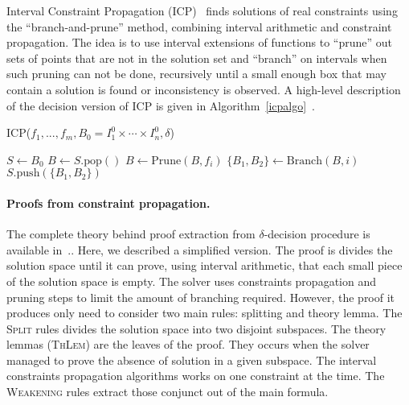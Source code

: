 Interval Constraint Propagation (ICP)~\cite{handbookICP} finds
solutions of real constraints using the ``branch-and-prune'' method, combining
interval arithmetic and constraint propagation. The idea is to use interval
extensions of functions to ``prune'' out sets of points that are not in the
solution set and ``branch'' on intervals when
such pruning can not be done, recursively until a small enough box
that may contain a solution is found or inconsistency is observed. A high-level description of the decision version of ICP is given in Algorithm~\ref{icpalgo}~\cite{handbookICP,DBLP:conf/cade/GaoAC12}.
\begin{algorithm}\label{algo1}
\caption{ICP($f_1,...,f_m, B_0 = I_1^0\times\cdots\times I_n^0, \delta$)}\label{icpalgo}
\begin{algorithmic}[1]
\Statex
    \State $S \gets B_0$
        \State $B \gets S.\mathrm{pop}()$
        \State $B \gets \mathrm{Prune}(B, f_i)$
        \EndWhile
                \State $\{B_1,B_2\} \gets \mathrm{Branch}(B, i)$
                \State $S.\mathrm{push}(\{B_1,B_2\})$
            \Else
                \State {}
            \EndIf
        \EndIf
    \EndWhile
    \State {}
\end{algorithmic}
\end{algorithm}





\paragraph{Proofs from constraint propagation.}

The complete theory behind proof extraction from $\delta$-decision procedure is available in~\cite{DBLP:conf/synasc/GaoKC14}..
Here, we described a simplified version.
The proof is divides the solution space until it can prove, using interval arithmetic, that each small piece of the solution space is empty.
The solver uses constraints propagation and pruning steps to limit the amount of branching required.
However, the proof it produces only need to consider two main rules: splitting and theory lemma.
The \textsc{Split} rules divides the solution space into two disjoint subspaces.
The theory lemmas (\textsc{ThLem}) are the leaves of the proof.
They occurs when the solver managed to prove the absence of solution in a given subspace.
The interval constraints propagation algorithms works on one constraint at the time. 
The \textsc{Weakening} rules extract those conjunct out of the main formula.

